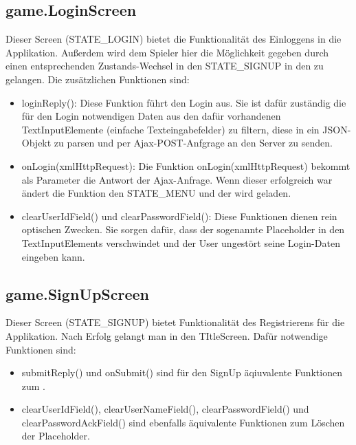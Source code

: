 \subsection{game.LoginScreen}
\label{Login}
Dieser Screen (STATE\_LOGIN) bietet die Funktionalit\"at des Einloggens in die Applikation. Au{\ss}erdem wird dem Spieler hier die M\"oglichkeit gegeben 
durch einen entsprechenden Zustands-Wechsel in den STATE\_SIGNUP in den  zu gelangen.
Die zus\"atzlichen Funktionen sind:
\begin{itemize}
	\item loginReply(): Diese Funktion f\"uhrt den Login aus. Sie ist daf\"ur zust\"andig die f\"ur den Login notwendigen Daten aus den
	         daf\"ur vorhandenen TextInputElemente (einfache Texteingabefelder) zu filtern, diese in ein JSON-Objekt zu parsen und per 
      		Ajax-POST-Anfgrage an den Server zu senden.
	\item onLogin(xmlHttpRequest): Die Funktion onLogin(xmlHttpRequest) bekommt als Parameter die Antwort der Ajax-Anfrage. Wenn 
	         dieser erfolgreich war \"andert die Funktion den STATE\_MENU und der wird geladen.
	\item clearUserIdField() und clearPasswordField(): Diese Funktionen dienen rein optischen Zwecken. Sie sorgen daf\"ur, dass der
      		 sogenannte Placeholder in den TextInputElements verschwindet und der User ungest\"ort seine Login-Daten eingeben kann. 
\end{itemize}

\subsection{game.SignUpScreen}
\label{SignUp}
Dieser Screen (STATE\_SIGNUP) bietet Funktionalit\"at des Registrierens f\"ur die Applikation. Nach Erfolg gelangt man in den TItleScreen. 
Daf\"ur notwendige Funktionen sind:
\begin{itemize}  
	\item submitReply() und onSubmit() sind f\"ur den SignUp \"aqiuvalente Funktionen zum  .
 	\item clearUserIdField(), clearUserNameField(), clearPasswordField() und clearPasswordAckField() sind ebenfalls \"aquivalente Funktionen
	         zum L\"oschen der Placeholder. 
\end{itemize}  

